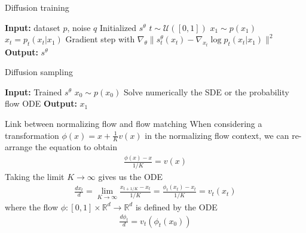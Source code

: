 \documentclass{beamer}
\begin{document}
\begin{frame}
    \begin{algorithm}[H]
        \caption{Diffusion training}\label{alg:diffusion_training}
            \begin{algorithmic}
                \State \textbf{Input:} dataset \(p\), noise \(q\)
                \State Initialized \(s^\theta\)
                    \State \(t\sim\mathcal{U}([0,1])\)
                    \State \(x_1\sim p(x_1)\)
                    \State \(x_t=p_t(x_t|x_1)\)
                    \State Gradient step with \(\nabla_\theta \| s_t^\theta (x_t) -\nabla_{x_t}\log p_t(x_t|x_1) \|^2\)
                \EndWhile
                \State \textbf{Output:} \(s^\theta\)
            \end{algorithmic}
        \end{algorithm}


        \begin{algorithm}[H]
            \caption{Diffusion sampling}\label{alg:diffusion_sampling}
            \begin{algorithmic}
                \State \textbf{Input:} Trained \(s^\theta\)
                \State \(x_0\sim p(x_0)\)
                \State Solve numerically the SDE or the probability flow ODE
                \State \textbf{Output:} \(x_1\)
                \end{algorithmic}
            \end{algorithm}

\end{frame}
\begin{frame}{Link between normalizing flow and flow matching}
    When considering a transformation \(\phi(x)=x+\frac{1}{K}v(x)\) in the normalizing flow context, we can re-arrange the equation to obtain
    \begin{align*}
        \frac{\phi(x)-x}{1/K}=v(x)
    \end{align*}
    Taking the limit \(K\rightarrow \infty\) gives us the ODE
    \begin{align*}
        \frac{dx_t}{d}=\lim_{K\rightarrow \infty}\frac{x_{t+1/K}-x_t}{1/K}=\frac{\phi_t(x_t)-x_t}{1/K}=v_t(x_t)
    \end{align*} 
    where the flow \( \phi:[0,1]\times\mathbb{R}^d\rightarrow\mathbb{R}^d\) is defined by the ODE
    \begin{align*}
        \frac{d\phi_t}{d}=v_t(\phi_t(x_0))
    \end{align*}
\end{frame}
\end{document}
